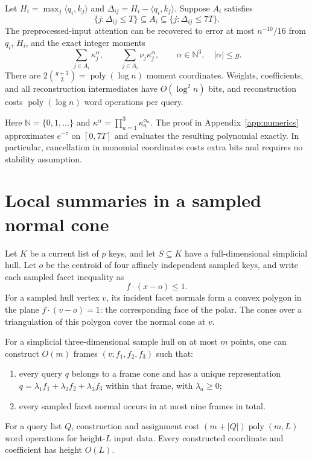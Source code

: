 \documentclass[notab,a4paper,UKenglish,numberwithinsect]{socg-lipics-v2021}
\newcommand{\N}{\mathbb N}
\newcommand{\ip}[2]{\langle #1,#2\rangle}
\newcommand{\poly}{\operatorname{poly}}
\begin{document}
\begin{lemma}\label{lem:moments}
Let $H_i=\max_j\ip{q_i}{k_j}$ and $\Delta_{ij}=H_i-\ip{q_i}{k_j}$. Suppose $A_i$ satisfies
\begin{equation}\label{eq:sandwich}
 \{j:\Delta_{ij}\le T\}\subseteq A_i
       \subseteq\{j:\Delta_{ij}\le7T\}.
\end{equation}
The preprocessed-input attention can be recovered to error at most $n^{-10}/16$ from $q_i$, $H_i$, and the exact integer moments
\begin{equation}\label{eq:moments}
 \sum_{j\in A_i}\kappa_j^\alpha,\qquad
 \sum_{j\in A_i}\nu_j\kappa_j^\alpha,
 \qquad \alpha\in\N^3,\quad|\alpha|\le g.
\end{equation}
There are $2\binom{g+3}{3}=\poly(\log n)$ moment coordinates. Weights, coefficients, and all reconstruction intermediates have $O(\log^2 n)$ bits, and reconstruction costs $\poly(\log n)$ word operations per query.
\end{lemma}

Here $\N=\{0,1,\ldots\}$ and $\kappa^\alpha=\prod_{a=1}^3\kappa_a^{\alpha_a}$. The proof in Appendix~\ref{app:numerics} approximates $e^{-z}$ on $[0,7T]$ and evaluates the resulting polynomial exactly. In particular, cancellation in monomial coordinates costs extra bits and requires no stability assumption.

\section{Local summaries in a sampled normal cone}\label{sec:frames}
Let $K$ be a current list of $p$ keys, and let $S\subseteq K$ have a full-dimensional simplicial hull. Let $o$ be the centroid of four affinely independent sampled keys, and write each sampled facet inequality as
\[
 f\cdot(x-o)\le1.
\]
For a sampled hull vertex $v$, its incident facet normals form a convex polygon in the plane $f\cdot(v-o)=1$: the corresponding face of the polar. The cones over a triangulation of this polygon cover the normal cone at $v$.

\begin{lemma}\label{lem:frames}
For a simplicial three-dimensional sample hull on at most $m$ points, one can construct $O(m)$ frames $(v;f_1,f_2,f_3)$ such that:
\begin{enumerate}
\item every query $q$ belongs to a frame cone and has a unique representation
      $q=\lambda_1f_1+\lambda_2f_2+\lambda_3f_3$ within that frame, with $\lambda_a\ge0$;
\item every sampled facet normal occurs in at most nine frames in total.
\end{enumerate}
For a query list $Q$, construction and assignment cost $(m+|Q|)\poly(m,L)$ word operations for height-$L$ input data. Every constructed coordinate and coefficient has height $O(L)$.
\end{lemma}
\end{document}
